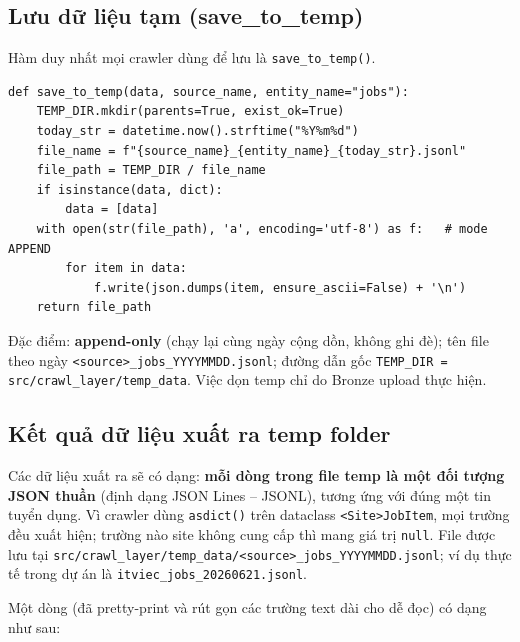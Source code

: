 \subsection{Lưu dữ liệu tạm (save\_to\_temp)}
\label{subsec:crawl-save}

Hàm duy nhất mọi crawler dùng để lưu là \texttt{save\_to\_temp()}.

\begin{lstlisting}[caption={save\_to\_temp() -- ghi append-only ra temp JSONL (src/crawl\_layer/utils/loader.py)},label={lst:save}]
def save_to_temp(data, source_name, entity_name="jobs"):
    TEMP_DIR.mkdir(parents=True, exist_ok=True)
    today_str = datetime.now().strftime("%Y%m%d")
    file_name = f"{source_name}_{entity_name}_{today_str}.jsonl"
    file_path = TEMP_DIR / file_name
    if isinstance(data, dict):
        data = [data]
    with open(str(file_path), 'a', encoding='utf-8') as f:   # mode APPEND
        for item in data:
            f.write(json.dumps(item, ensure_ascii=False) + '\n')
    return file_path
\end{lstlisting}

Đặc điểm: \textbf{append-only} (chạy lại cùng ngày cộng dồn, không ghi đè); tên
file theo ngày \texttt{<source>\_jobs\_YYYYMMDD.jsonl}; đường dẫn gốc
\texttt{TEMP\_DIR = src/crawl\_layer/temp\_data}. Việc dọn temp chỉ do Bronze
upload thực hiện.


\subsection{Kết quả dữ liệu xuất ra temp folder}
\label{subsec:crawl-temp-output}

Các dữ liệu xuất ra sẽ có dạng: \textbf{mỗi dòng trong file temp là một đối
tượng JSON thuần} (định dạng JSON Lines -- JSONL), tương ứng với đúng một tin
tuyển dụng. Vì crawler dùng \texttt{asdict()} trên dataclass
\texttt{<Site>JobItem}, mọi trường đều xuất hiện; trường nào site không cung cấp
thì mang giá trị \texttt{null}. File được lưu tại
\texttt{src/crawl\_layer/temp\_data/<source>\_jobs\_YYYYMMDD.jsonl}; ví dụ thực
tế trong dự án là \texttt{itviec\_jobs\_20260621.jsonl}.

Một dòng (đã pretty-print và rút gọn các trường text dài cho dễ đọc) có dạng
như sau:


